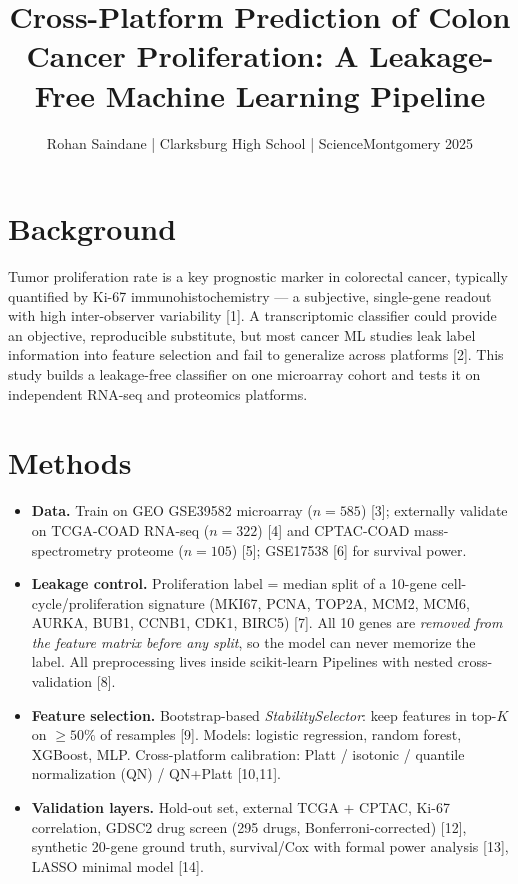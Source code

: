 \documentclass[10pt]{article}
\title{\vspace{-0.5cm}\textbf{Cross-Platform Prediction of Colon Cancer Proliferation: A Leakage-Free Machine Learning Pipeline}}
\author{Rohan Saindane \;|\; Clarksburg High School \;|\; ScienceMontgomery 2025}
\date{}
\begin{document}
\maketitle
\vspace{-1.0cm}

\section*{Background}
Tumor proliferation rate is a key prognostic marker in colorectal cancer, typically quantified by Ki-67 immunohistochemistry --- a subjective, single-gene readout with high inter-observer variability [1]. A transcriptomic classifier could provide an objective, reproducible substitute, but most cancer ML studies leak label information into feature selection and fail to generalize across platforms [2]. This study builds a leakage-free classifier on one microarray cohort and tests it on independent RNA-seq and proteomics platforms.

\section*{Methods}
\begin{itemize}\setlength\itemsep{1pt}
\item \textbf{Data.} Train on GEO GSE39582 microarray ($n=585$) [3]; externally validate on TCGA-COAD RNA-seq ($n=322$) [4] and CPTAC-COAD mass-spectrometry proteome ($n=105$) [5]; GSE17538 [6] for survival power.
\item \textbf{Leakage control.} Proliferation label = median split of a 10-gene cell-cycle/proliferation signature (MKI67, PCNA, TOP2A, MCM2, MCM6, AURKA, BUB1, CCNB1, CDK1, BIRC5) [7]. All 10 genes are \emph{removed from the feature matrix before any split}, so the model can never memorize the label. All preprocessing lives inside scikit-learn Pipelines with nested cross-validation [8].
\item \textbf{Feature selection.} Bootstrap-based \emph{StabilitySelector}: keep features in top-$K$ on $\geq 50\%$ of resamples [9]. Models: logistic regression, random forest, XGBoost, MLP. Cross-platform calibration: Platt / isotonic / quantile normalization (QN) / QN+Platt [10,11].
\item \textbf{Validation layers.} Hold-out set, external TCGA + CPTAC, Ki-67 correlation, GDSC2 drug screen (295 drugs, Bonferroni-corrected) [12], synthetic 20-gene ground truth, survival/Cox with formal power analysis [13], LASSO minimal model [14].
\end{itemize}
\end{document}
